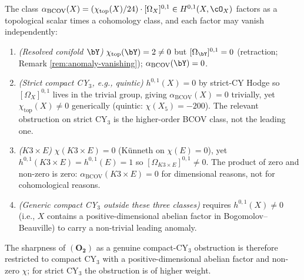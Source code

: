 \begin{lemma}
\label{lem:chi-top-bcov-split}
The class $\alpha_{\mathrm{BCOV}}(X) = (\chi_{\mathrm{top}}(X)/24)
\cdot [\Omega_X]^{0,1} \in H^{0,1}(X, \cO_X)$ factors as a
topological scalar times a cohomology class, and each factor may
vanish independently:
\begin{enumerate}[leftmargin=2em]
\item \emph{(Resolved conifold $\bY$)} $\chi_{\mathrm{top}}(\bY) = 2
 \neq 0$ but $[\Omega_\bY]^{0,1} = 0$ (retraction; Remark
 \ref{rem:anomaly-vanishing}); $\alpha_{\mathrm{BCOV}}(\bY) = 0$.
\item \emph{(Strict compact CY$_3$, e.g., quintic)}
 $h^{0,1}(X) = 0$ by strict-CY Hodge so $[\Omega_X]^{0,1}$ lives in
 the trivial group, giving $\alpha_{\mathrm{BCOV}}(X) = 0$
 trivially, yet $\chi_{\mathrm{top}}(X) \neq 0$ generically (quintic:
 $\chi(X_5) = -200$). The relevant obstruction on strict CY$_3$ is
 the higher-order BCOV class, not the leading one.
\item \emph{($K3 \times E$)} $\chi(K3 \times E) = 0$ (Künneth on
 $\chi(E) = 0$), yet $h^{0,1}(K3 \times E) = h^{0,1}(E) = 1$ so
 $[\Omega_{K3 \times E}]^{0,1} \neq 0$. The product of zero and
 non-zero is zero: $\alpha_{\mathrm{BCOV}}(K3 \times E) = 0$ for
 dimensional reasons, not for cohomological reasons.
\item \emph{(Generic compact CY$_3$ outside these three classes)}
 requires $h^{0,1}(X) \neq 0$ (i.e., $X$ contains a
 positive-dimensional abelian factor in Bogomolov--Beauville) to
 carry a non-trivial leading anomaly.
\end{enumerate}
The sharpness of $(\mathbf{O_2})$ as a genuine compact-CY$_3$
obstruction is therefore restricted to compact CY$_3$ with a
positive-dimensional abelian factor and non-zero $\chi$; for strict
CY$_3$ the obstruction is of higher weight.
\end{lemma}

